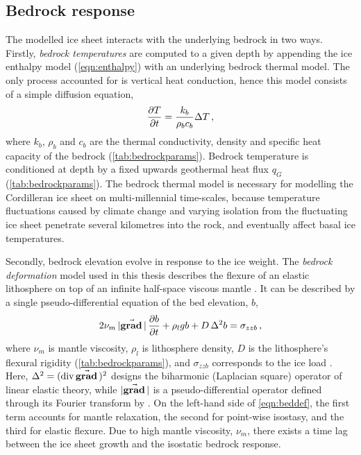 \documentclass{article}
\newcommand{\vect}[1]{\va*{#1}} %
\renewcommand{\div}[1]{\mathrm{div}\,#1}            %
\renewcommand{\grad}[1]{\vect{\mathrm{grad}}\,#1}   %
\begin{document}
\subsection{Bedrock response}

The modelled ice sheet interacts with the underlying bedrock in two ways.
Firstly, \emph{bedrock temperatures} are computed to a given depth by
appending the
ice enthalpy model (\ref{eqn:enthalpy}) with an underlying bedrock thermal
model. The only process accounted for is vertical heat conduction, hence this model
consists of a simple diffusion equation,
\begin{equation}
    \pdv{T}{t} = \frac{k_b}{\rho_b c_b} \Delta T \,,
\end{equation}
where $k_b$, $\rho_b$ and $c_b$ are the thermal conductivity, density and
specific heat capacity of the bedrock (\cref{tab:bedrockparams}).
Bedrock temperature is conditioned at depth by a fixed upwards geothermal heat
flux $q_G$  (\cref{tab:bedrockparams}). The bedrock thermal model
is necessary for modelling the Cordilleran ice sheet on multi-millennial
time-scales, because temperature fluctuations caused by climate change and
varying isolation from the fluctuating ice sheet penetrate several kilometres
into the rock, and eventually affect basal ice temperatures.

Secondly, bedrock elevation evolve in response to the ice weight. The
\emph{bedrock deformation} model used in this thesis describes the flexure of
an elastic
lithosphere on top of an infinite half-space viscous mantle
\citep{Lingle.Clark.1985}. It can be described by a single pseudo-differential
equation of the bed elevation, $b$,
\begin{equation}
    \label{eqn:beddef}
    2\nu_m\,|\grad|\,\pdv{b}{t} + \rho_l g b + D\,\Delta^2 b = \sigma_{zzb} \,,
\end{equation}
where $\nu_m$ is mantle viscosity, $\rho_l$ is lithosphere density, $D$ is the
lithosphere's flexural rigidity (\cref{tab:bedrockparams}), and $\sigma_{zzb}$
corresponds to the ice load
\citep{Bueler.etal.2007}. Here, ${\Delta^2 = (\div\grad{})^2}$ designs the
biharmonic (Laplacian square) operator of
linear elastic theory, while $|\grad{}|$ is a pseudo-differential operator
defined through its Fourier transform by \citet[Eq.~6]{Bueler.etal.2007}. On
the left-hand side of \cref{eqn:beddef}, the first term accounts for mantle
relaxation, the second for point-wise isostasy, and the third for elastic
flexure. Due to high mantle viscosity, $\nu_m$, there exists a time lag between
the ice sheet growth and the isostatic bedrock response.
\end{document}

